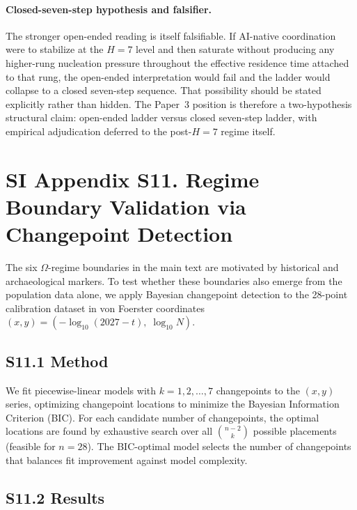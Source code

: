 \documentclass[11pt]{article}
\begin{document}
\paragraph{Closed-seven-step hypothesis and falsifier.}
The stronger open-ended reading is itself falsifiable.
If AI-native coordination were to stabilize at the
$H{=}7$
level and then saturate without producing any higher-rung nucleation pressure
throughout the effective residence time attached to that rung,
the open-ended interpretation would fail and the ladder would collapse to a
closed seven-step sequence.
That possibility should be stated explicitly rather than hidden.
The Paper~3 position is therefore a two-hypothesis structural claim:
open-ended ladder versus closed seven-step ladder,
with empirical adjudication deferred to the post-$H{=}7$ regime itself.


\section*{SI Appendix S11. Regime Boundary Validation via Changepoint Detection}

The six $\Omega$-regime boundaries in the main text are motivated by historical and archaeological markers.
To test whether these boundaries also emerge from the population data alone, we apply Bayesian changepoint detection to the 28-point calibration dataset in von Foerster coordinates $(x, y) = (-\log_{10}(2027 - t),\;\log_{10} N)$.

\subsection*{S11.1 Method}

We fit piecewise-linear models with $k = 1, 2, \ldots, 7$ changepoints to the $(x, y)$ series, optimizing changepoint locations to minimize the Bayesian Information Criterion (BIC).
For each candidate number of changepoints, the optimal locations are found by exhaustive search over all $\binom{n-2}{k}$ possible placements (feasible for $n = 28$).
The BIC-optimal model selects the number of changepoints that balances fit improvement against model complexity.

\subsection*{S11.2 Results}
\end{document}
